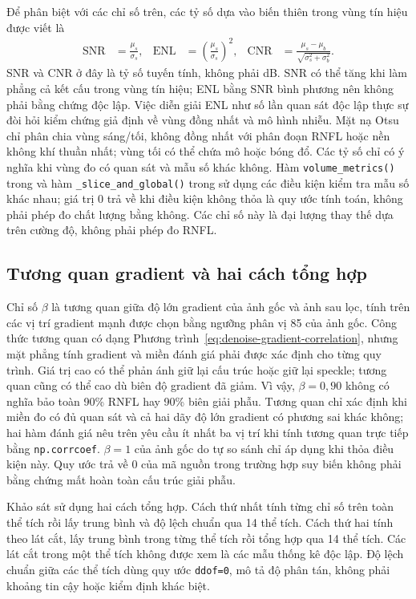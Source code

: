 \documentclass[14pt,a4paper,oneside]{extreport}
\begin{document}
Để phân biệt với các chỉ số trên, các tỷ số dựa vào biến thiên
trong vùng tín hiệu được viết là
\begin{align}
 \mathrm{SNR}&=\frac{\mu_s}{\sigma_s},&
 \mathrm{ENL}&=\left(\frac{\mu_s}{\sigma_s}\right)^2,&
 \mathrm{CNR}&=\frac{\mu_s-\mu_b}{\sqrt{\sigma_s^2+\sigma_b^2}}.
 \label{eq:denoise-14-signal-metrics}
\end{align}
SNR và CNR ở đây là tỷ số tuyến tính, không phải dB. SNR có thể
tăng khi làm phẳng cả kết cấu trong vùng tín hiệu; ENL bằng SNR
bình phương nên không phải bằng chứng độc lập. Việc diễn giải ENL
như số lần quan sát độc lập thực sự đòi hỏi kiểm chứng giả định
về vùng đồng nhất và mô hình nhiễu. Mặt nạ Otsu chỉ phân chia
vùng sáng/tối, không đồng nhất với phân đoạn RNFL hoặc nền không
khí thuần nhất; vùng tối có thể chứa mô hoặc bóng đổ.
Các tỷ số chỉ có ý nghĩa khi vùng đo có quan sát và mẫu số khác không.
Hàm \texttt{volume\_metrics()} trong
 và hàm
\texttt{\_slice\_and\_global()} trong
 sử dụng các điều kiện kiểm
tra mẫu số khác nhau; giá trị 0 trả về khi điều kiện không thỏa là quy
ước tính toán, không phải phép đo chất lượng bằng không. Các chỉ số
này là đại lượng thay thế dựa trên cường độ, không phải phép đo RNFL.

\subsection{Tương quan gradient và hai cách tổng hợp}
Chỉ số $\beta$ là tương quan giữa độ lớn gradient của ảnh gốc
và ảnh sau lọc, tính trên các vị trí gradient mạnh được chọn bằng
ngưỡng phân vị 85 của ảnh gốc. Công thức tương quan có dạng
Phương trình~\eqref{eq:denoise-gradient-correlation}, nhưng mặt
phẳng tính gradient và miền đánh giá phải được xác định cho từng
quy trình. Giá trị cao có thể phản ánh giữ lại cấu trúc hoặc giữ
lại speckle; tương quan cũng có thể cao dù biên độ gradient đã
giảm. Vì vậy, $\beta=0{,}90$ không có nghĩa bảo toàn 90\% RNFL
hay 90\% biên giải phẫu. Tương quan chỉ xác định khi miền đo có đủ
quan sát và cả hai dãy độ lớn gradient có phương sai khác không;
hai hàm đánh giá nêu trên yêu cầu ít nhất ba vị trí khi tính tương
quan trực tiếp bằng \texttt{np.corrcoef}.
$\beta=1$ của ảnh gốc do tự so sánh chỉ áp dụng khi thỏa điều kiện này.
Quy ước trả về 0 của mã nguồn trong trường hợp suy biến không phải
bằng chứng mất hoàn toàn cấu trúc giải phẫu.

Khảo sát sử dụng hai cách tổng hợp. Cách thứ nhất tính từng chỉ
số trên toàn thể tích rồi lấy trung bình và độ lệch chuẩn qua
14 thể tích. Cách thứ hai tính theo lát cắt, lấy trung bình trong
từng thể tích rồi tổng hợp qua 14 thể tích. Các lát cắt trong một
thể tích không được xem là các mẫu thống kê độc lập. Độ lệch chuẩn
giữa các thể tích dùng quy ước \texttt{ddof=0}, mô tả độ phân tán,
không phải khoảng tin cậy hoặc kiểm định khác biệt.
\end{document}
